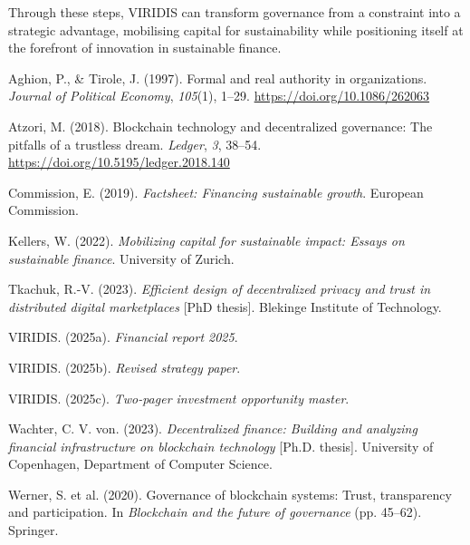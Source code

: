 \documentclass[
  english,
  12pt,
  oneside,
  open=any]{scrbook}
\newlength{\cslhangindent}
\newenvironment{CSLReferences}[2] %
 {\begin{list}{}{%
  \setlength{\itemindent}{0pt}
  \setlength{\leftmargin}{0pt}
  \setlength{\parsep}{0pt}
  \ifodd #1
   \setlength{\leftmargin}{\cslhangindent}
   \setlength{\itemindent}{-1\cslhangindent}
  \fi
  \setlength{\itemsep}{#2\baselineskip}}}
 {\end{list}}
\begin{document}
Through these steps, VIRIDIS can transform governance from a constraint
into a strategic advantage, mobilising capital for sustainability while
positioning itself at the forefront of innovation in sustainable
finance.

\label{refs}
\begin{CSLReferences}{1}{0}
Aghion, P., \& Tirole, J. (1997). Formal and real authority in
organizations. \emph{Journal of Political Economy}, \emph{105}(1),
1--29. \url{https://doi.org/10.1086/262063}

Atzori, M. (2018). Blockchain technology and decentralized governance:
The pitfalls of a trustless dream. \emph{Ledger}, \emph{3}, 38--54.
\url{https://doi.org/10.5195/ledger.2018.140}

Commission, E. (2019). \emph{Factsheet: Financing sustainable growth}.
European Commission.

Kellers, W. (2022). \emph{Mobilizing capital for sustainable impact:
Essays on sustainable finance}. University of Zurich.

Tkachuk, R.-V. (2023). \emph{Efficient design of decentralized privacy
and trust in distributed digital marketplaces} {[}PhD thesis{]}.
Blekinge Institute of Technology.

VIRIDIS. (2025a). \emph{Financial report 2025}.

VIRIDIS. (2025b). \emph{Revised strategy paper}.

VIRIDIS. (2025c). \emph{Two-pager investment opportunity master}.

Wachter, C. V. von. (2023). \emph{Decentralized finance: Building and
analyzing financial infrastructure on blockchain technology} {[}Ph.D.
thesis{]}. University of Copenhagen, Department of Computer Science.

Werner, S. et al. (2020). Governance of blockchain systems: Trust,
transparency and participation. In \emph{Blockchain and the future of
governance} (pp. 45--62). Springer.

\end{CSLReferences}


\backmatter
\end{document}
